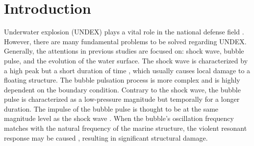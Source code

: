 \documentclass[%
 aip,
 amsmath,amssymb,
 reprint,%
]{revtex4-1}
\begin{document}
\section{Introduction}\label{s:introduction}
\label{s:introduction}
Underwater explosion (UNDEX) plays a vital role in the national defense field \citep{RN2475}. However, there are many fundamental problems to be solved regarding UNDEX. Generally, the attentions in previous studies are focused on: shock wave, bubble pulse, and the evolution of the water surface. The shock wave is characterized by a high peak but a short duration of time \citep{RN2732,RN2733,RN2734}, which usually causes local damage to a floating structure. The bubble pulsation process is more complex and is highly dependent on the boundary condition\cite{WOS:L}. Contrary to the shock wave, the bubble pulse is characterized as a low-pressure magnitude but temporally for a longer duration. The impulse of the bubble pulse is thought to be at the same magnitude level as the shock wave \citep{RN2475}. When the bubble's oscillation frequency matches with the natural frequency of the marine structure, the violent resonant response may be caused \citep{RN2609,RN3015}, resulting in significant structural damage.
\end{document}

